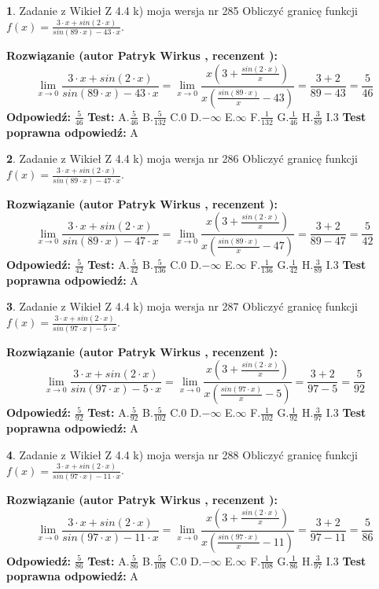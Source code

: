 \documentclass[12pt, a4paper]{article}
\theoremstyle{definition} %
\newtheorem{zad}{}
\newcommand{\zadStart}[1]{\begin{zad}#1\newline}
\newcommand{\zadStop}{\end{zad}}
\newcommand{\rozwStart}[2]{\noindent \textbf{Rozwiązanie (autor #1 , recenzent #2): }\newline}
\newcommand{\rozwStop}{\newline}
\newcommand{\odpStart}{\noindent \textbf{Odpowiedź:}\newline}
\newcommand{\odpStop}{\newline}
\newcommand{\testStart}{\noindent \textbf{Test:}\newline}
\newcommand{\testStop}{\newline}
\newcommand{\kluczStart}{\noindent \textbf{Test poprawna odpowiedź:}\newline}
\newcommand{\kluczStop}{\newline}
\begin{document}
\zadStart{Zadanie z Wikieł Z 4.4 k) moja wersja nr 285}
Obliczyć granicę funkcji $f(x)=\frac{3\cdot x +sin(2\cdot x)}{sin(89\cdot x) -43\cdot x}$.
\zadStop
\rozwStart{Patryk Wirkus}{}
$$\lim\limits_{x\to 0}\frac{3\cdot x +sin(2\cdot x)}{sin(89\cdot x) -43\cdot x}
=\lim\limits_{x\to 0}\frac{x(3+\frac{sin(2\cdot x)}{x})}{x(\frac{sin(89\cdot x)}{x}-43)}
=\frac{3+2}{89-43} = \frac{5}{46}$$
\rozwStop
\odpStart
$\frac{5}{46}$
\odpStop
\testStart
A.$\frac{5}{46}$
B.$\frac{5}{132}$
C.$0$
D.$-\infty$
E.$\infty$
F.$\frac{1}{132}$
G.$\frac{1}{46}$
H.$\frac{3}{89}$
I.$3$
\testStop
\kluczStart
A
\kluczStop



\zadStart{Zadanie z Wikieł Z 4.4 k) moja wersja nr 286}
Obliczyć granicę funkcji $f(x)=\frac{3\cdot x +sin(2\cdot x)}{sin(89\cdot x) -47\cdot x}$.
\zadStop
\rozwStart{Patryk Wirkus}{}
$$\lim\limits_{x\to 0}\frac{3\cdot x +sin(2\cdot x)}{sin(89\cdot x) -47\cdot x}
=\lim\limits_{x\to 0}\frac{x(3+\frac{sin(2\cdot x)}{x})}{x(\frac{sin(89\cdot x)}{x}-47)}
=\frac{3+2}{89-47} = \frac{5}{42}$$
\rozwStop
\odpStart
$\frac{5}{42}$
\odpStop
\testStart
A.$\frac{5}{42}$
B.$\frac{5}{136}$
C.$0$
D.$-\infty$
E.$\infty$
F.$\frac{1}{136}$
G.$\frac{1}{42}$
H.$\frac{3}{89}$
I.$3$
\testStop
\kluczStart
A
\kluczStop



\zadStart{Zadanie z Wikieł Z 4.4 k) moja wersja nr 287}
Obliczyć granicę funkcji $f(x)=\frac{3\cdot x +sin(2\cdot x)}{sin(97\cdot x) -5\cdot x}$.
\zadStop
\rozwStart{Patryk Wirkus}{}
$$\lim\limits_{x\to 0}\frac{3\cdot x +sin(2\cdot x)}{sin(97\cdot x) -5\cdot x}
=\lim\limits_{x\to 0}\frac{x(3+\frac{sin(2\cdot x)}{x})}{x(\frac{sin(97\cdot x)}{x}-5)}
=\frac{3+2}{97-5} = \frac{5}{92}$$
\rozwStop
\odpStart
$\frac{5}{92}$
\odpStop
\testStart
A.$\frac{5}{92}$
B.$\frac{5}{102}$
C.$0$
D.$-\infty$
E.$\infty$
F.$\frac{1}{102}$
G.$\frac{1}{92}$
H.$\frac{3}{97}$
I.$3$
\testStop
\kluczStart
A
\kluczStop



\zadStart{Zadanie z Wikieł Z 4.4 k) moja wersja nr 288}
Obliczyć granicę funkcji $f(x)=\frac{3\cdot x +sin(2\cdot x)}{sin(97\cdot x) -11\cdot x}$.
\zadStop
\rozwStart{Patryk Wirkus}{}
$$\lim\limits_{x\to 0}\frac{3\cdot x +sin(2\cdot x)}{sin(97\cdot x) -11\cdot x}
=\lim\limits_{x\to 0}\frac{x(3+\frac{sin(2\cdot x)}{x})}{x(\frac{sin(97\cdot x)}{x}-11)}
=\frac{3+2}{97-11} = \frac{5}{86}$$
\rozwStop
\odpStart
$\frac{5}{86}$
\odpStop
\testStart
A.$\frac{5}{86}$
B.$\frac{5}{108}$
C.$0$
D.$-\infty$
E.$\infty$
F.$\frac{1}{108}$
G.$\frac{1}{86}$
H.$\frac{3}{97}$
I.$3$
\testStop
\kluczStart
A
\kluczStop
\end{document}
